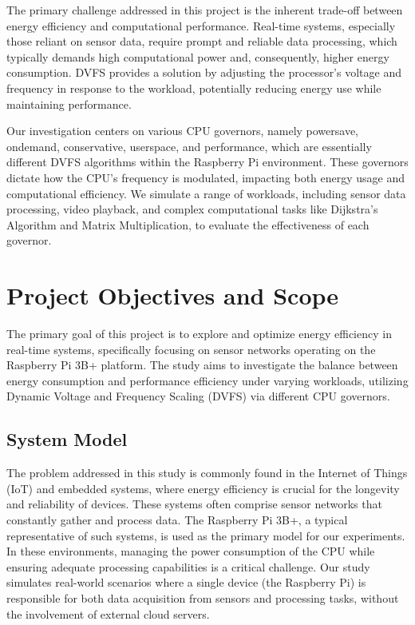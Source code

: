 \documentclass[conference]{IEEEtran}
\begin{document}
The primary challenge addressed in this project is the inherent trade-off between energy efficiency and computational performance. Real-time systems, especially those reliant on sensor data, require prompt and reliable data processing, which typically demands high computational power and, consequently, higher energy consumption. DVFS provides a solution by adjusting the processor's voltage and frequency in response to the workload, potentially reducing energy use while maintaining performance.

Our investigation centers on various CPU governors, namely powersave, ondemand, conservative, userspace, and performance, which are essentially different DVFS algorithms within the Raspberry Pi environment. These governors dictate how the CPU's frequency is modulated, impacting both energy usage and computational efficiency. We simulate a range of workloads, including sensor data processing, video playback, and complex computational tasks like Dijkstra's Algorithm and Matrix Multiplication, to evaluate the effectiveness of each governor.  

\section{Project Objectives and Scope}

The primary goal of this project is to explore and optimize energy efficiency in real-time systems, specifically focusing on sensor networks operating on the Raspberry Pi 3B+ platform. The study aims to investigate the balance between energy consumption and performance efficiency under varying workloads, utilizing Dynamic Voltage and Frequency Scaling (DVFS) via different CPU governors.

\subsection{System Model}
The problem addressed in this study is commonly found in the Internet of Things (IoT) and embedded systems, where energy efficiency is crucial for the longevity and reliability of devices. These systems often comprise sensor networks that constantly gather and process data. The Raspberry Pi 3B+, a typical representative of such systems, is used as the primary model for our experiments. In these environments, managing the power consumption of the CPU while ensuring adequate processing capabilities is a critical challenge. Our study simulates real-world scenarios where a single device (the Raspberry Pi) is responsible for both data acquisition from sensors and processing tasks, without the involvement of external cloud servers.
\end{document}
